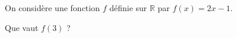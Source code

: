 
On considère une fonction $f$ définie sur $\mathbb{R}$ par $f(x)=2x-1$.

Que vaut $f(3)$ ?

\smallskip
{}
